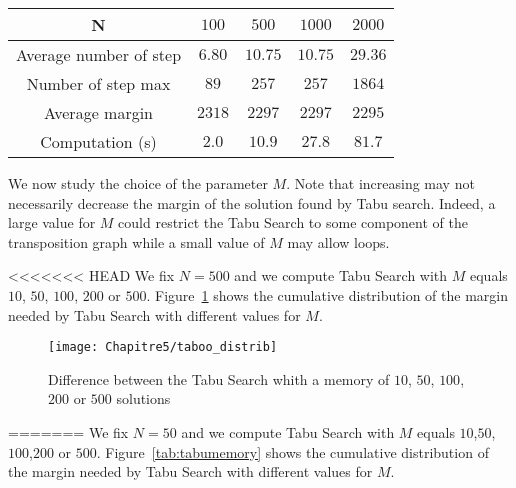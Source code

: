 \begin{center}
\begin{tabular}{ |c|c|c|c|c| }
\hline
    N & $100$&$500$& $1000$& $2000$\\
    \hline
    Average number of step & $6.80$ & $10.75$& $10.75$& $29.36$\\
    \hline
    Number of step max & $89$ & $257$& $257$& $1864$\\

    \hline

     Average margin & $2318$ & $2297$& $2297$& $2295$\\

    \hline
    Computation (s) & $2.0$ & $10.9$& $27.8$& $81.7$\\

    \hline
 \end{tabular}
\end{center}




We now study the choice of the parameter $M$. Note that increasing may not necessarily decrease the margin
of the solution found by Tabu search. Indeed, a large value for $M$ could restrict the Tabu Search to some component of the transposition graph while a small value of $M$ may allow loops.

<<<<<<< HEAD
We fix $N = 500$ and we compute Tabu Search with $M$ equals $10$, $50$, $100$, $200$ or $500$.
Figure~\ref{fig:tabudistrib} shows the cumulative distribution of the margin needed by Tabu Search with different values for $M$. 

\begin{figure}[h]
	\centering
	\texttt{[image: Chapitre5/taboo\_distrib]}
\caption{ Difference between the Tabu Search whith a memory of $10$, $50$, $100$, $200$ or $500$ solutions}
\label{fig:tabudistrib}
\end{figure}
=======
We fix $N = 50$ and we compute Tabu Search with $M$ equals $10$,$50$,$100$,$200$ or $500$.
Figure~\ref{tab:tabumemory} shows the cumulative distribution of the margin needed by Tabu Search with different values for $M$. 

